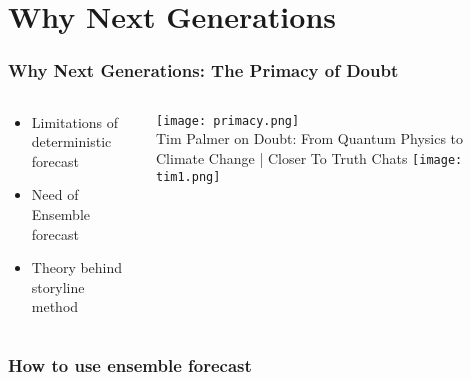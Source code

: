 \documentclass{beamer}
\begin{document}
\section{Why Next Generations}

\begin{frame}
\frametitle{Why Next Generations: The Primacy of Doubt}

\begin{columns}
	
	\begin{column}{0.75\textwidth}
		\begin{itemize}
			\item Limitations of deterministic forecast 
			\item Need of Ensemble forecast
			\item Theory behind storyline method 
		\end{itemize}
	\end{column}
	
	\begin{column}{0.5\textwidth}
		\texttt{[image: primacy.png]} \\
		\tiny{Tim Palmer on Doubt: From Quantum Physics to Climate Change | Closer To Truth Chats}
		\vspace{1cm}
		\texttt{[image: tim1.png]} \\
	\end{column}
	
\end{columns}

\end{frame}

\begin{frame}
	\frametitle{How to use ensemble forecast}


\end{frame}
\end{document}
